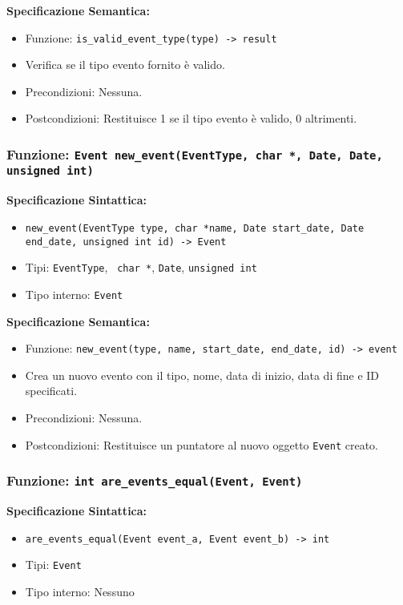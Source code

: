 \documentclass[11pt]{scrartcl} %
\begin{document}
\textbf{Specificazione Semantica:}
\begin{itemize}
\item Funzione: \texttt{is\_valid\_event\_type(type) -> result}
\item Verifica se il tipo evento fornito è valido.
\item Precondizioni: Nessuna.
\item Postcondizioni: Restituisce 1 se il tipo evento è valido, 0 altrimenti.
\end{itemize}

\subsubsection{Funzione: \texttt{Event new\_event(EventType,  char *, Date, Date, unsigned int)}}

\textbf{Specificazione Sintattica:}
\begin{itemize}
\item \texttt{new\_event(EventType type,  char *name, Date start\_date, Date end\_date, unsigned int id) -> Event}
\item Tipi: \texttt{EventType}, \texttt{ char *}, \texttt{Date}, \texttt{unsigned int}
\item Tipo interno: \texttt{Event}
\end{itemize}

\textbf{Specificazione Semantica:}
\begin{itemize}
\item Funzione: \texttt{new\_event(type, name, start\_date, end\_date, id) -> event}
\item Crea un nuovo evento con il tipo, nome, data di inizio, data di fine e ID specificati.
\item Precondizioni: Nessuna.
\item Postcondizioni: Restituisce un puntatore al nuovo oggetto \texttt{Event} creato.
\end{itemize}

\subsubsection{Funzione: \texttt{int are\_events\_equal(Event, Event)}}

\textbf{Specificazione Sintattica:}
\begin{itemize}
\item \texttt{are\_events\_equal(Event event\_a, Event event\_b) -> int}
\item Tipi: \texttt{Event}
\item Tipo interno: Nessuno
\end{itemize}
\end{document}
